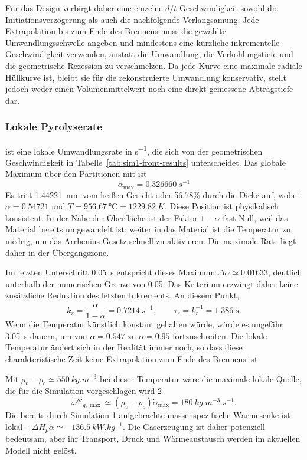 \documentclass[oneside,openany]{amsdtx}
\begin{document}
Für das Design verbirgt daher eine einzelne \(d/t\) Geschwindigkeit sowohl die Initiationsverzögerung als auch die nachfolgende Verlangsamung. Jede Extrapolation bis zum Ende des Brennens muss die gewählte Umwandlungsschwelle angeben und mindestens eine kürzliche inkrementelle Geschwindigkeit verwenden, anstatt die Umwandlung, die Verkohlungstiefe und die geometrische Rezession zu verschmelzen. Da jede Kurve eine maximale radiale Hüllkurve ist, bleibt sie für die rekonstruierte Umwandlung konservativ, stellt jedoch weder einen Volumenmittelwert noch eine direkt gemessene Abtragstiefe dar.

\subsubsection{Lokale Pyrolyserate }

 ist eine lokale Umwandlungsrate in \si{s^{-1}}, die sich von der geometrischen Geschwindigkeit in Tabelle~\ref{tab:sim1-front-results} unterscheidet. Das globale Maximum über den Partitionen mit  ist
\[
\boxed{\dot\alpha_\mathrm{max}=\SI{0.326660}{s^{-1}}}
\]
Es tritt \SI{1.44221}{mm} vom heißen Gesicht oder 56.78\% durch die Dicke auf, wobei \(\alpha=0.54721\) und \(T=\SI{956.67}{\degreeCelsius}=\SI{1229.82}{K}\). Diese Position ist physikalisch konsistent: In der Nähe der Oberfläche ist der Faktor \(1-\alpha\) fast Null, weil das Material bereits umgewandelt ist; weiter in das Material ist die Temperatur zu niedrig, um das Arrhenius-Gesetz schnell zu aktivieren. Die maximale Rate liegt daher in der Übergangszone.

Im letzten Unterschritt \SI{0.05}{s} entspricht dieses Maximum \(\Delta\alpha\simeq0.01633\), deutlich unterhalb der numerischen Grenze von 0.05. Das Kriterium  erzwingt daher keine zusätzliche Reduktion des letzten Inkrements. An diesem Punkt,
\[
k_r=\frac{\dot\alpha}{1-\alpha}=\SI{0.7214}{s^{-1}}, \qquad \tau_r=k_r^{-1}=\SI{1.386}{s}.
\]
Wenn die Temperatur künstlich konstant gehalten würde, würde es ungefähr \SI{3.05}{s} dauern, um von \(\alpha=0.547\) zu \(\alpha=0.95\) fortzuschreiten. Die lokale Temperatur ändert sich in der Realität immer noch, so dass diese charakteristische Zeit keine Extrapolation zum Ende des Brennens ist.

Mit \(\rho_v-\rho_c\simeq\SI{550}{kg.m^{-3}}\) bei dieser Temperatur wäre die maximale lokale Quelle, die für die Simulation vorgeschlagen wird 2
\[
\dot\omega'''_{g,\max}\simeq (\rho_v-\rho_c)\dot\alpha_\mathrm{max}=\SI{180}{kg.m^{-3}.s^{-1}}.
\]
Die bereits durch Simulation 1 aufgebrachte massenspezifische Wärmesenke ist lokal \(-\Delta H_p\dot\alpha\simeq-\SI{136.5}{kW.kg^{-1}}\). Die Gaserzeugung ist daher potenziell bedeutsam, aber ihr Transport, Druck und Wärmeaustausch werden im aktuellen Modell nicht gelöst.
\end{document}
